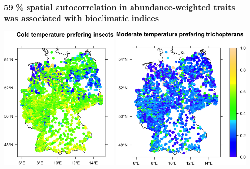 \documentclass[10pt, compress]{beamer}
\begin{document}

\begin{frame}[fragile]
  \frametitle{59 \% spatial autocorrelation in abundance-weighted traits\protect\\was associated with bioclimatic indices}
  \centering
  \includegraphics[width=0.45\textwidth]{images/Cold.png}
  \pause
  \hspace{2pt}
  \includegraphics[width=0.535\textwidth]{images/Modetri.png}
\end{frame}

\end{document}
